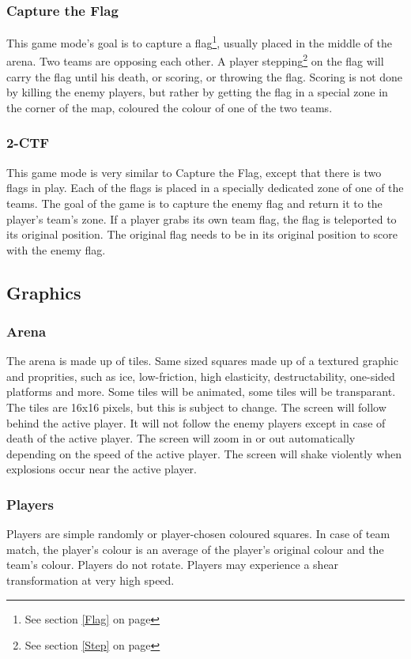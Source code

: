 \documentclass{article}
\begin{document}
\subsubsection{Capture the Flag}
This game mode's goal is to capture a flag\footnote{See section \ref{Flag} on page \pageref{Flag}}, usually placed in the middle of the arena. Two teams are opposing each other. A player stepping\footnote{See section \ref{Step} on page \pageref{Step}} on the flag will carry the flag until his death, or scoring, or throwing the flag. Scoring is not done by killing the enemy players, but rather by getting the flag in a special zone in the corner of the map, coloured the colour of one of the two teams.

\subsubsection{2-CTF}
This game mode is very similar to Capture the Flag, except that there is two flags in play. Each of the flags is placed in a specially dedicated zone of one of the teams. The goal of the game is to capture the enemy flag and return it to the player's team's zone. If a player grabs its own team flag, the flag is teleported to its original position. The original flag needs to be in its original position to score with the enemy flag.

\subsection{Graphics}
\label{Graphics}
\subsubsection{Arena}
The arena is made up of tiles. Same sized squares made up of a textured graphic and proprities, such as ice, low-friction, high elasticity, destructability, one-sided platforms and more. Some tiles will be animated, some tiles will be transparant. The tiles are 16x16 pixels, but this is subject to change. The screen will follow behind the active player. It will not follow the enemy players except in case of death of the active player. The screen will zoom in or out automatically depending on the speed of the active player. The screen will shake violently when explosions occur near the active player.

\subsubsection{Players}
Players are simple randomly or player-chosen coloured squares. In case of team match, the player's colour is an average of the player's original colour and the team's colour. Players do not rotate. Players may experience a shear transformation at very high speed.
\end{document}
